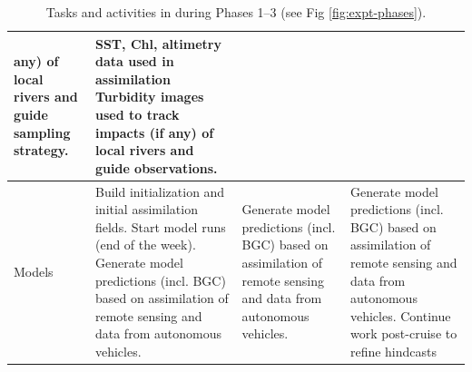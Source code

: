 \begin{table}[!t]
{\begin{tabular}{|p{4cm}|p{4cm}|p{4cm}|p{4cm}|}
                             any) of local rivers and guide sampling
                                                                     strategy.
                                                     &SST, Chl,
                                                       altimetry data
                                                       used in
                                                       assimilation 
                                            Turbidity images used to
                                            track impacts (if any) of
                                            local rivers and guide
                                            observations.\\
    \hline
    Models&Build initialization and initial assimilation fields. 
            Start model runs (end of the week). Generate model
            predictions (incl. BGC) based on assimilation of remote sensing and data
                                  from autonomous vehicles.&Generate model
            predictions (incl. BGC) based on assimilation of remote sensing and data
                                  from autonomous vehicles.&Generate model
            predictions (incl. BGC) based on assimilation of remote sensing and data
                                  from autonomous vehicles. Continue
                                                             work
                                                             post-cruise
    to refine hindcasts\\
    \hline
  \end{tabular}
  \label{tab:tasks}
  \caption{Tasks and activities in \proj during Phases 1--3 (see Fig \ref{fig:expt-phases}).}
  }
\end{table}

